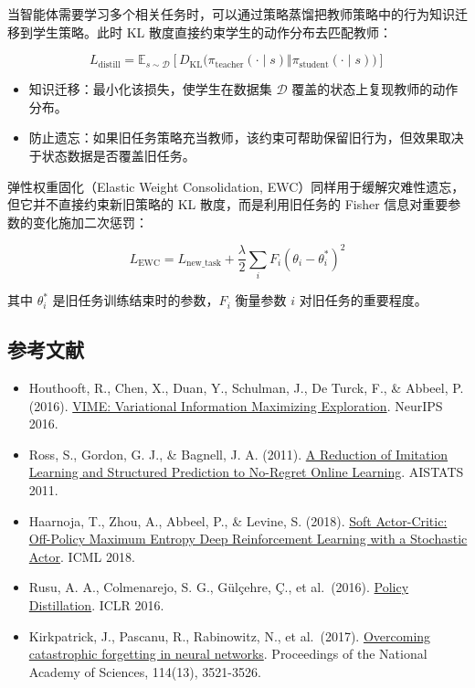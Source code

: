 当智能体需要学习多个相关任务时，可以通过策略蒸馏把教师策略中的行为知识迁移到学生策略。此时 KL 散度直接约束学生的动作分布去匹配教师：

\[
L_{\mathrm{distill}}
=
\mathbb{E}_{s\sim\mathcal{D}}
\left[
D_{\mathrm{KL}}\bigl(
\pi_{\mathrm{teacher}}(\cdot\mid s)
\Vert
\pi_{\mathrm{student}}(\cdot\mid s)
\bigr)
\right]
\]

\begin{itemize}
\tightlist
\item
  知识迁移：最小化该损失，使学生在数据集 \(\mathcal{D}\) 覆盖的状态上复现教师的动作分布。
\item
  防止遗忘：如果旧任务策略充当教师，该约束可帮助保留旧行为，但效果取决于状态数据是否覆盖旧任务。
\end{itemize}

弹性权重固化（Elastic Weight Consolidation, EWC）同样用于缓解灾难性遗忘，但它并不直接约束新旧策略的 KL 散度，而是利用旧任务的 Fisher 信息对重要参数的变化施加二次惩罚：

\[
L_{\mathrm{EWC}}
=
L_{\mathrm{new\_task}}
+
\frac{\lambda}{2}
\sum_i F_i(\theta_i-\theta_i^{*})^{2}
\]

其中 \(\theta_i^{*}\) 是旧任务训练结束时的参数，\(F_i\) 衡量参数 \(i\) 对旧任务的重要程度。

\hypertarget{ux53c2ux8003ux6587ux732e-59}{%
\subsection{参考文献}\label{ux53c2ux8003ux6587ux732e-59}}

\vspace{0.25em}
\begin{itemize}
\tightlist
\item
  Houthooft, R., Chen, X., Duan, Y., Schulman, J., De Turck, F., \& Abbeel, P. (2016). \href{https://arxiv.org/abs/1605.09674}{VIME: Variational Information Maximizing Exploration}. NeurIPS 2016.
\item
  Ross, S., Gordon, G. J., \& Bagnell, J. A. (2011). \href{https://proceedings.mlr.press/v15/ross11a.html}{A Reduction of Imitation Learning and Structured Prediction to No-Regret Online Learning}. AISTATS 2011.
\item
  Haarnoja, T., Zhou, A., Abbeel, P., \& Levine, S. (2018). \href{https://arxiv.org/abs/1801.01290}{Soft Actor-Critic: Off-Policy Maximum Entropy Deep Reinforcement Learning with a Stochastic Actor}. ICML 2018.
\item
  Rusu, A. A., Colmenarejo, S. G., Gülçehre, Ç., et al.~(2016). \href{https://arxiv.org/abs/1511.06295}{Policy Distillation}. ICLR 2016.
\item
  Kirkpatrick, J., Pascanu, R., Rabinowitz, N., et al.~(2017). \href{https://doi.org/10.1073/pnas.1611835114}{Overcoming catastrophic forgetting in neural networks}. Proceedings of the National Academy of Sciences, 114(13), 3521-3526.
\end{itemize}

